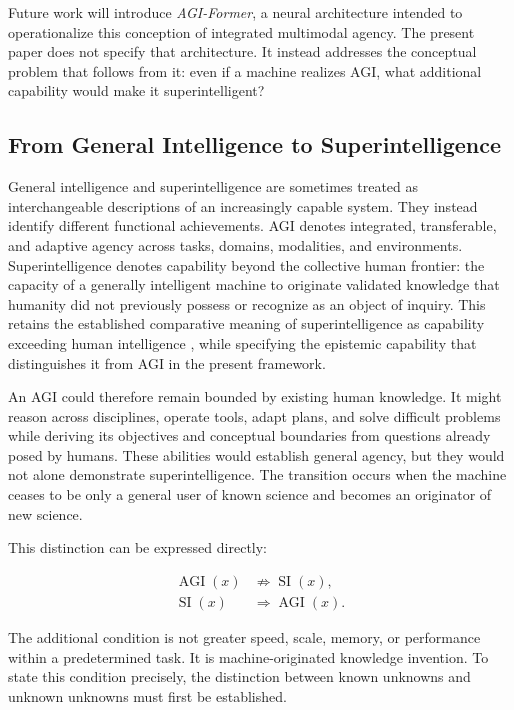 Future work will introduce \emph{AGI-Former}, a neural architecture intended to
operationalize this conception of integrated multimodal agency. The present
paper does not specify that architecture. It instead addresses the conceptual
problem that follows from it: even if a machine realizes AGI, what additional
capability would make it superintelligent?

\subsection{\textbf{From General Intelligence to Superintelligence}}

General intelligence and superintelligence are sometimes treated as
interchangeable descriptions of an increasingly capable system. They instead
identify different functional achievements. AGI denotes integrated,
transferable, and adaptive agency across tasks, domains, modalities, and
environments. Superintelligence denotes capability beyond the collective human
frontier: the capacity of a generally intelligent machine to originate
validated knowledge that humanity did not previously possess or recognize as
an object of inquiry. This retains the established comparative meaning of
superintelligence as capability exceeding human intelligence
\cite{bostrom2014superintelligence}, while specifying the epistemic capability
that distinguishes it from AGI in the present framework.

An AGI could therefore remain bounded by existing human knowledge. It might
reason across disciplines, operate tools, adapt plans, and solve difficult
problems while deriving its objectives and conceptual boundaries from questions
already posed by humans. These abilities would establish general agency, but
they would not alone demonstrate superintelligence. The transition occurs when
the machine ceases to be only a general user of known science and becomes an
originator of new science.

This distinction can be expressed directly:

\begin{equation}
\begin{aligned}
\operatorname{AGI}(x)
&\not\Rightarrow \operatorname{SI}(x),\\
\operatorname{SI}(x)
&\Rightarrow \operatorname{AGI}(x).
\end{aligned}
\label{eq:agi_si_relation}
\end{equation}

The additional condition is not greater speed, scale, memory, or performance
within a predetermined task. It is machine-originated knowledge invention. To
state this condition precisely, the distinction between known unknowns and
unknown unknowns must first be established.

